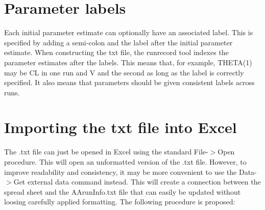 \section{Parameter labels}
Each initial parameter estimate can optionally have an associated label. This is specified by adding a semi-colon and the label after the initial parameter estimate. When constructing  the txt file, the runrecord tool indexes the parameter estimates after the labels. This means that, for example, THETA(1) may be CL in one run and V and the second as long as the label is correctly specified. It also means that parameters should be given consistent labels across runs.



\section{Importing the txt file into Excel}
The .txt file can just be opened in Excel using the standard File-$>$Open procedure. This will open an unformatted version of the .txt file. However, to improve readability and consistency, it may be more convenient to use the Data-$>$Get external data command instead. This will create a connection between the spread sheet and the AArunInfo.txt file that can easily be updated without loosing carefully applied formatting. The following procedure is proposed:
